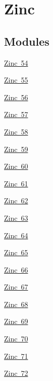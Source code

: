 \hypertarget{group___isotope_const-_zinc}{}\section{Zinc}
\label{group___isotope_const-_zinc}
\subsection*{Modules}
\begin{DoxyCompactItemize}
\item 
\mbox{\hyperlink{group___isotope_const-_zinc-_zn54}{Zinc 54}}
\item 
\mbox{\hyperlink{group___isotope_const-_zinc-_zn55}{Zinc 55}}
\item 
\mbox{\hyperlink{group___isotope_const-_zinc-_zn56}{Zinc 56}}
\item 
\mbox{\hyperlink{group___isotope_const-_zinc-_zn57}{Zinc 57}}
\item 
\mbox{\hyperlink{group___isotope_const-_zinc-_zn58}{Zinc 58}}
\item 
\mbox{\hyperlink{group___isotope_const-_zinc-_zn59}{Zinc 59}}
\item 
\mbox{\hyperlink{group___isotope_const-_zinc-_zn60}{Zinc 60}}
\item 
\mbox{\hyperlink{group___isotope_const-_zinc-_zn61}{Zinc 61}}
\item 
\mbox{\hyperlink{group___isotope_const-_zinc-_zn62}{Zinc 62}}
\item 
\mbox{\hyperlink{group___isotope_const-_zinc-_zn63}{Zinc 63}}
\item 
\mbox{\hyperlink{group___isotope_const-_zinc-_zn64}{Zinc 64}}
\item 
\mbox{\hyperlink{group___isotope_const-_zinc-_zn65}{Zinc 65}}
\item 
\mbox{\hyperlink{group___isotope_const-_zinc-_zn66}{Zinc 66}}
\item 
\mbox{\hyperlink{group___isotope_const-_zinc-_zn67}{Zinc 67}}
\item 
\mbox{\hyperlink{group___isotope_const-_zinc-_zn68}{Zinc 68}}
\item 
\mbox{\hyperlink{group___isotope_const-_zinc-_zn69}{Zinc 69}}
\item 
\mbox{\hyperlink{group___isotope_const-_zinc-_zn70}{Zinc 70}}
\item 
\mbox{\hyperlink{group___isotope_const-_zinc-_zn71}{Zinc 71}}
\item 
\mbox{\hyperlink{group___isotope_const-_zinc-_zn72}{Zinc 72}}
\item 

\end{DoxyCompactItemize}

